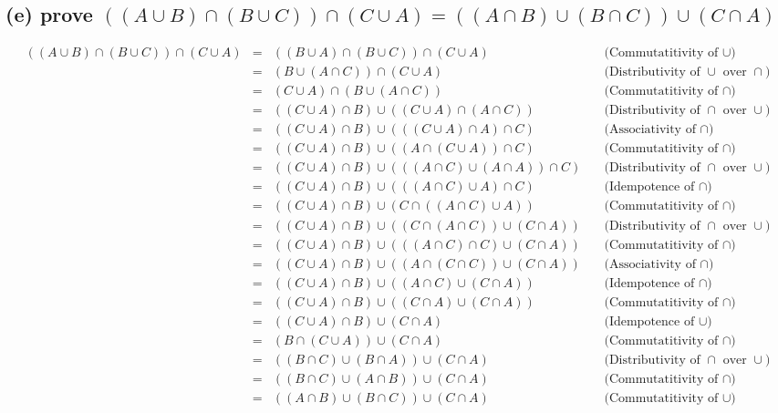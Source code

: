 \documentclass[]{article}
\begin{document}
\begin{spacing}{1.5}
\subsection*{(e) prove $ ((A \cup B) \cap (B \cup C)) \cap (C \cup A) = ((A \cap B) \cup (B \cap C)) \cup (C \cap A) $}
\[\begin{array}{rclr}
	((A \cup  B) \cap  (B \cup  C)) \cap  (C \cup  A)&=& ((B \cup  A) \cap  (B \cup  C)) \cap  (C \cup  A) &\quad\text{(Commutatitivity of $\cup$)}\\
	&=& (B \cup  (A \cap  C)) \cap  (C \cup  A) &\quad\text{(Distributivity of $\cup$ over $\cap$)}\\
	&=& (C \cup  A) \cap  (B \cup  (A \cap  C)) &\quad\text{(Commutatitivity of $\cap$)}\\
	&=& ((C \cup  A) \cap  B) \cup  ((C \cup  A) \cap  (A \cap  C)) &\quad\text{(Distributivity of $\cap$ over $\cup$)}\\
	&=& ((C \cup  A) \cap  B) \cup  (((C \cup  A) \cap  A) \cap  C) &\quad\text{(Associativity of $\cap$)}\\
	&=& ((C \cup  A) \cap  B) \cup  ((A \cap  (C \cup  A)) \cap  C) &\quad\text{(Commutatitivity of $\cap$)}\\
	&=& ((C \cup  A) \cap  B) \cup  (((A \cap  C) \cup  (A \cap  A)) \cap  C) &\quad\text{(Distributivity of $\cap$ over $\cup$)}\\
	&=& ((C \cup  A) \cap  B) \cup  (((A \cap  C) \cup  A) \cap  C) &\quad\text{(Idempotence of $\cap$)}\\
	&=& ((C \cup  A) \cap  B) \cup  (C \cap  ((A \cap  C) \cup  A)) &\quad\text{(Commutatitivity of $\cap$)}\\
	&=& ((C \cup  A) \cap  B) \cup  ((C \cap  (A \cap  C)) \cup  (C \cap  A)) &\quad\text{(Distributivity of $\cap$ over $\cup$)}\\
	&=& ((C \cup  A) \cap  B) \cup  (((A \cap  C) \cap  C) \cup  (C \cap  A)) &\quad\text{(Commutatitivity of $\cap$)}\\
	&=& ((C \cup  A) \cap  B) \cup  ((A \cap  (C \cap  C)) \cup  (C \cap  A)) &\quad\text{(Associativity of $\cap$)}\\
	&=& ((C \cup  A) \cap  B) \cup  ((A \cap  C) \cup  (C \cap  A)) &\quad\text{(Idempotence of $\cap$)}\\
	&=& ((C \cup  A) \cap  B) \cup  ((C \cap  A) \cup  (C \cap  A)) &\quad\text{(Commutatitivity of $\cap$)}\\
	&=& ((C \cup  A) \cap  B) \cup  (C \cap  A) &\quad\text{(Idempotence of $\cup$)}\\
	&=& (B \cap  (C \cup  A)) \cup  (C \cap  A) &\quad\text{(Commutatitivity of $\cap$)}\\
	&=& ((B \cap  C) \cup  (B \cap  A)) \cup  (C \cap  A) &\quad\text{(Distributivity of $\cap$ over $\cup$)}\\
	&=& ((B \cap  C) \cup  (A \cap  B)) \cup  (C \cap  A) &\quad\text{(Commutatitivity of $\cap$)}\\
	&=& ((A \cap  B) \cup  (B \cap  C)) \cup  (C \cap  A) &\quad\text{(Commutatitivity of $\cup$)}
\end{array}\]


\end{spacing}
\end{document}
